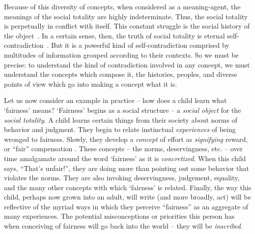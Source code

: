 Because of this diversity of concepts, when considered as a meaning-agent, the meanings of the social totality are highly indeterminate. Thus, the social totality is perpetually in conflict with itself. This constant struggle is the social history of the object~\citep{foucault2002order}. In a certain sense, then, the truth of social totality is eternal self-contradiction~\citep{Hegel:PhG}. But it is a powerful kind of self-contradiction comprised by multitudes of information grouped according to their contexts. So we must be precise: to understand the kind of contradiction involved in any concept, we must understand the concepts which compose it, the histories, peoples, and diverse points of view which go into making a concept what it is. 

Let us now consider an example in practice -- how does a child learn what `fairness' means? `Fairness' begins as a social structure -- a \textit{social object} for the \textit{social totality}. A child learns certain things from their society about norms of behavior and judgment. They begin to relate instinctual \textit{experiences} of being wronged to fairness. Slowly, they develop a \textit{concept} of effort as \textit{signifying} reward, or ``fair'' compensation \citep{Rawls:TheoryJustice}. These concepts -- the norms, deservingness, etc. -- over time amalgamate around the word `fairness' as it is \textit{concretized}. When this child says, ``That's unfair!'', they are doing more than pointing out some behavior that violates the norms. They are also invoking deservingness, judgement, equality, and the many other concepts with which `fairness' is related. Finally, the way this child, perhaps now grown into an adult, will write (and more broadly, act) will be reflective of the myriad ways in which they perceive ``fairness'' as an aggregate of many experiences. The potential misconceptions or priorities this person has when conceiving of fairness will go back into the world -- they will be \textit{inscribed}.



